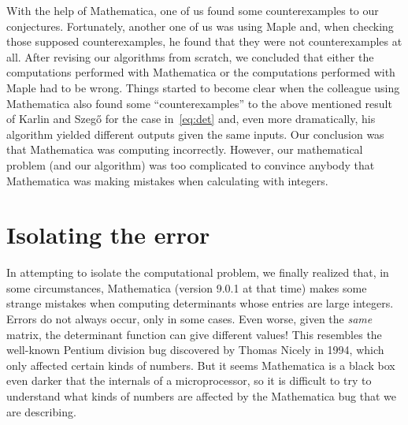 \documentclass[12pt]{article}
\begin{document}
With the help of Mathematica, one of us found some counterexamples to our conjectures. Fortunately, another one of us was using Maple and, when checking those supposed counterexamples, he found that they were not counterexamples at all. After revising our algorithms from scratch, we concluded that either the computations performed with Mathematica or the computations performed with Maple had to be wrong. Things started to become clear when the colleague using Mathematica also found some ``counterexamples'' to the above mentioned result of Karlin and Szeg\H{o} for the case in~\eqref{eq:det} and, even more dramatically, his algorithm yielded different outputs given the same inputs. Our conclusion was that Mathematica was computing incorrectly. However, our mathematical problem (and our algorithm) was too complicated to convince anybody that Mathematica was making mistakes when calculating with integers.

\section*{Isolating the error}

In attempting to isolate the computational problem, we finally realized that, in some circumstances, Mathematica (version 9.0.1 at that time) makes some strange mistakes when computing determinants whose entries are large integers. Errors do not always occur, only in some cases. Even worse, given the \emph{same} matrix, the determinant function can give different values! This resembles the well-known Pentium division bug discovered by Thomas Nicely in 1994, which only affected certain kinds of numbers. But it seems Mathematica is a black box even darker that the internals of a microprocessor, so it is difficult to try to understand what kinds of numbers are affected by the Mathematica bug that we are describing.
\end{document}
